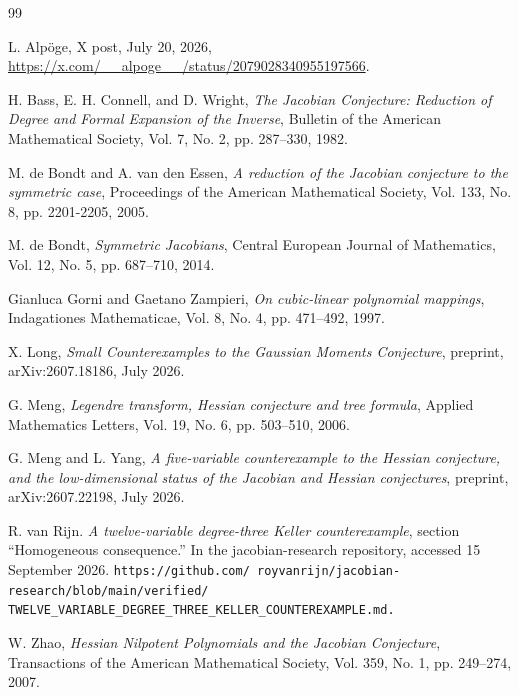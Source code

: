 \documentclass[11pt,a4paper]{article}
\begin{document}
\begin{thebibliography}{99}

L. Alpöge,
X post, July 20, 2026,
\url{https://x.com/__alpoge__/status/2079028340955197566}.

H. Bass, E. H. Connell, and D. Wright,
\emph{The Jacobian Conjecture: Reduction of Degree and Formal Expansion of the Inverse},
Bulletin of the American Mathematical Society, Vol. 7, No. 2, pp. 287--330, 1982.

M. de Bondt and A. van den Essen,
\emph{A reduction of the Jacobian conjecture to the symmetric case},
Proceedings of the American Mathematical Society, Vol. 133, No. 8, pp. 2201-2205, 2005.

M. de Bondt,
\emph{Symmetric Jacobians},
Central European Journal of Mathematics, Vol. 12, No. 5, pp. 687--710, 2014.

Gianluca Gorni and Gaetano Zampieri,
\emph{On cubic-linear polynomial mappings},
Indagationes Mathematicae, Vol. 8, No. 4, pp. 471--492, 1997.

X. Long,
\emph{Small Counterexamples to the Gaussian Moments Conjecture},
preprint, arXiv:2607.18186, July 2026.

G. Meng,
\emph{Legendre transform, Hessian conjecture and tree formula},
Applied Mathematics Letters, Vol. 19, No. 6, pp. 503--510, 2006.

G. Meng and L. Yang,
\emph{A five-variable counterexample to the Hessian conjecture, and the low-dimensional status of the Jacobian and Hessian conjectures}, preprint, arXiv:2607.22198, July 2026.

R. van Rijn. \emph{A twelve-variable degree-three Keller counterexample}, section “Homogeneous
consequence.” In the jacobian-research repository, accessed 15 September
2026. \texttt{https://github.com/
royvanrijn/jacobian-research/blob/main/verified/
TWELVE\_VARIABLE\_DEGREE\_THREE\_KELLER\_COUNTEREXAMPLE.md.}

W. Zhao,
\emph{Hessian Nilpotent Polynomials and the Jacobian Conjecture},
Transactions of the American Mathematical Society, Vol. 359, No. 1, pp. 249--274, 2007.

\end{thebibliography}
\end{document}
